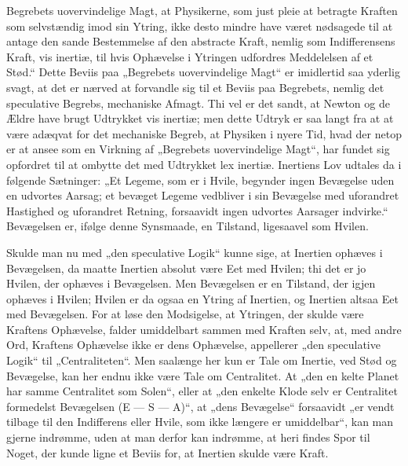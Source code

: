 \documentclass[12pt]{book}
\newcommand{\apage}[1]{\marginnote{\footnotesize\textit{[#1]}}}
\begin{document}
Begrebets uovervindelige Magt, at Physikerne, som just \apage{337} pleie at betragte Kraften som
selvstændig imod sin Ytring, ikke desto mindre have været nødsagede til at antage den
sande Bestemmelse af den abstracte Kraft, nemlig som Indifferensens Kraft, vis inertiæ,
til hvis Ophævelse i Ytringen udfordres Meddelelsen af et Stød.“ Dette Beviis paa
„Begrebets uovervindelige Magt“ er imidlertid saa yderlig svagt, at det er nærved at
forvandle sig til et Beviis paa Begrebets, nemlig det speculative Begrebs, mechaniske
Afmagt. Thi vel er det sandt, at Newton og de Ældre have brugt Udtrykket vis inertiæ;
men dette Udtryk er saa langt fra at
at være adæqvat for det mechaniske Begreb, at Physiken i nyere Tid, hvad der netop er at
ansee som en Virkning af „Begrebets uovervindelige Magt“, har fundet sig opfordret til
at ombytte det med Udtrykket lex inertiæ. Inertiens Lov udtales da i følgende Sætninger:
„Et Legeme, som er i Hvile, begynder ingen Bevægelse uden en udvortes Aarsag; et bevæget
Legeme vedbliver i sin Bevægelse med uforandret Hastighed og uforandret Retning,
forsaavidt ingen udvortes Aarsager indvirke.“ Bevægelsen er, ifølge denne Synsmaade, en
Tilstand, ligesaavel som Hvilen.

Skulde man nu med „den speculative Logik“ kunne sige, at Inertien ophæves i Bevægelsen,
da maatte Inertien absolut være Eet med Hvilen; thi det er jo Hvilen, der ophæves i
Bevægelsen. Men Bevægelsen er en Tilstand, der igjen ophæves i Hvilen; Hvilen er da
ogsaa en Ytring af Inertien, og Inertien altsaa Eet med Bevægelsen. For at løse den
Modsigelse, at Ytringen, der skulde være Kraftens Ophævelse, falder umiddelbart sammen
med Kraften selv, at, med andre Ord, Kraftens Ophævelse ikke er dens Ophævelse,
appellerer „den speculative Logik“ til „Centraliteten“. Men saalænge her kun er Tale om
Inertie, ved Stød og Bevægelse, kan her endnu ikke være Tale om Centralitet. At „den
en\-%
kelte \apage{338} Planet har samme Centralitet som Solen“, eller at „den enkelte Klode selv er
Centralitet formedelst Bevægelsen (E — S — A)“, at „dens Bevægelse“ forsaavidt „er vendt
tilbage til den Indifferens eller Hvile, som ikke længere er umiddelbar“, kan man gjerne
indrømme, uden at man derfor kan indrømme, at heri findes Spor til Noget, der kunde ligne
et Beviis for, at Inertien skulde være Kraft.
\end{document}
